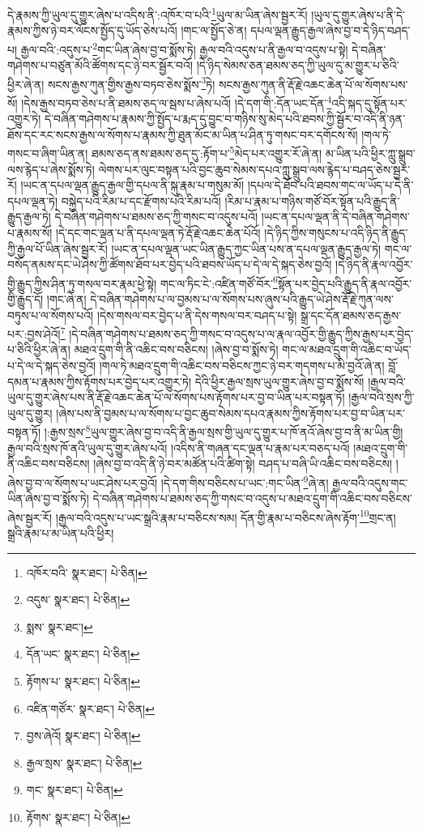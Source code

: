 དེ་རྣམས་ཀྱི་ཡུལ་དུ་གྱུར་ཞེས་པ་འདིས་ནི་:འཁོར་བ་པའི་\footnote{འཁོར་བའི་  སྣར་ཐང་།  པེ་ཅིན། }ཡུལ་མ་ཡིན་ཞེས་སྦྱར་རོ། །ཡུལ་དུ་གྱུར་ཞེས་པ་ནི་དེ་རྣམས་ཀྱིས་ཉེ་བར་ལོངས་སྤྱོད་དུ་ཡོད་ཅེས་པའོ། །གང་ལ་སྤྱོད་ཅེ་ན། དཔལ་ལྡན་རྒྱུད་རྒྱལ་ཞེས་བྱ་བ་དེ་ཉིད་བཤད་པ། རྒྱལ་བའི་:འདུས་པ་\footnote{འདུས་  སྣར་ཐང་།  པེ་ཅིན། }གང་ཡིན་ཞེས་བྱ་བ་སྨོས་ཏེ། རྒྱལ་བའི་འདུས་པ་ནི་རྒྱལ་བ་འདུས་པ་སྟེ། དེ་བཞིན་གཤེགས་པ་བཙུན་མོའི་ཚོགས་དང་ཉེ་བར་སྦྱོར་བའོ། །དེ་ཉིད་སེམས་ཅན་ཐམས་ཅད་ཀྱི་ཡུལ་དུ་མ་གྱུར་པ་ཅིའི་ཕྱིར་ཞེ་ན། སངས་རྒྱས་ཀུན་གྱིས་རྒྱས་བཏབ་ཅེས་སྨོས་\footnote{སྨས་  སྣར་ཐང་། }ཏེ། སངས་རྒྱས་ཀུན་ནི་རྡོ་རྗེ་འཆང་ཆེན་པོ་ལ་སོགས་པས་སོ། །དེས་རྒྱས་བཏབ་ཅེས་པ་ནི་ཐམས་ཅད་ལ་སྦས་པ་ཞེས་པའོ། །དེ་དག་གི་:དོན་ཡང་དོན་\footnote{དོན་ཡང་  སྣར་ཐང་།  པེ་ཅིན། }འདི་སྐད་དུ་སྟོན་པར་འགྱུར་ཏེ། དེ་བཞིན་གཤེགས་པ་རྣམས་ཀྱི་སྤྱོད་པ་རྨད་དུ་བྱུང་བ་གཉིས་སུ་མེད་པའི་ཐབས་ཀྱི་སྦྱོར་བ་འདི་ནི་ཉན་ཐོས་དང་རང་སངས་རྒྱས་ལ་སོགས་པ་རྣམས་ཀྱི་ཐུན་མོང་མ་ཡིན་པ་ཤིན་ཏུ་གསང་བར་དགོངས་སོ། །གལ་ཏེ་གསང་བ་ཞིག་ཡིན་ན། ཐམས་ཅད་ནས་ཐམས་ཅད་དུ་:རྟོག་པ་\footnote{རྟོགས་པ་  སྣར་ཐང་།  པེ་ཅིན། }མེད་པར་འགྱུར་རོ་ཞེ་ན། མ་ཡིན་པའི་ཕྱིར་ཀླུ་སྒྲུབ་ལས་རྙེད་པ་ཞེས་སྨོས་ཏེ། ལེགས་པར་ལུང་བསྟན་པའི་བྱང་ཆུབ་སེམས་དཔའ་ཀླུ་སྒྲུབ་ལས་རྙེད་པ་བཤད་ཅེས་སྦྱར་རོ། །ཡང་ན་དཔལ་ལྡན་རྒྱུད་རྒྱལ་གྱི་དཔལ་ནི་སྐུ་རྣམ་པ་གསུམ་མོ། །དཔལ་དེ་ཐོབ་པའི་ཐབས་གང་ལ་ཡོད་པ་དེ་ནི་དཔལ་ལྡན་ཏེ། བསྐྱེད་པའི་རིམ་པ་དང་རྫོགས་པའི་རིམ་པའོ། །རིམ་པ་རྣམ་པ་གཉིས་གཙོ་བོར་སྟོན་པའི་རྒྱུད་ནི་རྒྱུད་རྒྱལ་ཏེ། དེ་བཞིན་གཤེགས་པ་ཐམས་ཅད་ཀྱི་གསང་བ་འདུས་པའོ། །ཡང་ན་དཔལ་ལྡན་ནི་དེ་བཞིན་གཤེགས་པ་རྣམས་སོ། །དེ་དང་གང་ལྡན་པ་ནི་དཔལ་ལྡན་ཏེ་རྡོ་རྗེ་འཆང་ཆེན་པོའོ། །དེ་ཉིད་ཀྱིས་གསུངས་པ་འདི་ཉིད་ནི་རྒྱུད་ཀྱི་རྒྱལ་པོ་ཡིན་ཞེས་སྦྱར་རོ། །ཡང་ན་དཔལ་ལྡན་ཡང་ཡིན་རྒྱུད་ཀྱང་ཡིན་པས་ན་དཔལ་ལྡན་རྒྱུད་རྒྱལ་ཏེ། གང་ལ་བསོད་ནམས་དང་ཡེ་ཤེས་ཀྱི་ཚོགས་ཐོབ་པར་བྱེད་པའི་ཐབས་ཡོད་པ་དེ་ལ་དེ་སྐད་ཅེས་བྱའོ། །དེ་ཉིད་ནི་རྣལ་འབྱོར་གྱི་རྒྱུད་ཀྱིས་ཤིན་ཏུ་གསལ་བར་རྣམ་ཕྱེ་སྟེ། གང་ལ་ཏིང་ངེ་:འཛིན་གཙོ་བོར་\footnote{འཛིན་གཙོར་  སྣར་ཐང་།  པེ་ཅིན། }སྟོན་པར་བྱེད་པའི་རྒྱུད་ནི་རྣལ་འབྱོར་གྱི་རྒྱུད་དོ། །གང་ཞེ་ན། དེ་བཞིན་གཤེགས་པ་ལ་བྱམས་པ་ལ་སོགས་པས་ཞུས་པའི་རྒྱུད་ཡེ་ཤེས་རྡོ་རྗེ་ཀུན་ལས་བཏུས་པ་ལ་སོགས་པའོ། །དེས་གསལ་བར་བྱེད་པ་ནི་དེས་གསལ་བར་བཤད་པ་སྟེ། སྒྲ་དང་དོན་ཐམས་ཅད་རྒྱས་པར་:བྱས་ཤེའོ།\footnote{བྱས་ཞེའོ།  སྣར་ཐང་།  པེ་ཅིན། } །དེ་བཞིན་གཤེགས་པ་ཐམས་ཅད་ཀྱི་གསང་བ་འདུས་པ་ལ་རྣལ་འབྱོར་གྱི་རྒྱུད་ཀྱིས་རྒྱས་པར་བྱེད་པ་ཅིའི་ཕྱིར་ཞེ་ན། མཐའ་དྲུག་གི་ནི་འཆིང་བས་བཅིངས། །ཞེས་བྱ་བ་སྨོས་ཏེ། གང་ལ་མཐའ་དྲུག་གི་འཆིང་བ་ཡོད་པ་དེ་ལ་དེ་སྐད་ཅེས་བྱའོ། །གལ་ཏེ་མཐའ་དྲུག་གི་འཆིང་བས་བཅིངས་ཀྱང་ཉེ་བར་གདགས་པ་མི་བྱའོ་ཞེ་ན། བློ་དམན་པ་རྣམས་ཀྱིས་རྟོགས་པར་བྱེད་པར་འགྱུར་ཏེ། དེའི་ཕྱིར་རྒྱལ་སྲས་ཡུལ་གྱུར་ཞེས་བྱ་བ་སྨོས་སོ། །རྒྱལ་བའི་ཡུལ་དུ་གྱུར་ཞེས་པས་ནི་རྡོ་རྗེ་འཆང་ཆེན་པོ་ལ་སོགས་པས་རྟོགས་པར་བྱ་བ་ཡིན་པར་བསྟན་ཏོ། །རྒྱལ་བའི་སྲས་ཀྱི་ཡུལ་དུ་གྱུར། །ཞེས་པས་ནི་བྱམས་པ་ལ་སོགས་པ་བྱང་ཆུབ་སེམས་དཔའ་རྣམས་ཀྱིས་རྟོགས་པར་བྱ་བ་ཡིན་པར་བསྟན་ཏོ། །:རྒྱས་སྲས་\footnote{རྒྱལ་སྲས་  སྣར་ཐང་།  པེ་ཅིན། }ཡུལ་གྱུར་ཞེས་བྱ་བ་འདི་ནི་རྒྱལ་སྲས་གྱི་ཡུལ་དུ་གྱུར་པ་ཁོ་ནའོ་ཞེས་བྱ་བ་ནི་མ་ཡིན་གྱི། རྒྱལ་བའི་སྲས་ཁོ་ནའི་ཡུལ་དུ་གྱུར་ཞེས་པའོ། །འདིས་ནི་གཞན་དང་ལྡན་པ་རྣམ་པར་བཅད་པའོ། །མཐའ་དྲུག་གི་ནི་འཆིང་བས་བཅིངས། །ཞེས་བྱ་བ་འདི་ནི་ཉེ་བར་མཚོན་པའི་ཚིག་སྟེ། བཤད་པ་བཞི་ཡི་འཆིང་བས་བཅིངས། །ཞེས་བྱ་བ་ལ་སོགས་པ་ཡང་ཤེས་པར་བྱའོ། །དེ་དག་གིས་བཅིངས་པ་ཡང་:གང་ཡིན་\footnote{གང་  སྣར་ཐང་།  པེ་ཅིན། }ཞེ་ན། རྒྱལ་བའི་འདུས་གང་ཡིན་ཞེས་བྱ་བ་སྨོས་ཏེ། དེ་བཞིན་གཤེགས་པ་ཐམས་ཅད་ཀྱི་གསང་བ་འདུས་པ་མཐའ་དྲུག་གི་འཆིང་བས་བཅིངས་ཞེས་སྦྱར་རོ། །རྒྱལ་བའི་འདུས་པ་ཡང་སྒྲའི་རྣམ་པ་བཅིངས་སམ། དོན་གྱི་རྣམ་པ་བཅིངས་ཞེས་རྟོག་\footnote{རྟོགས་  སྣར་ཐང་།  པེ་ཅིན། }གྲང་ན། སྒྲའི་རྣམ་པ་མ་ཡིན་པའི་ཕྱིར། 